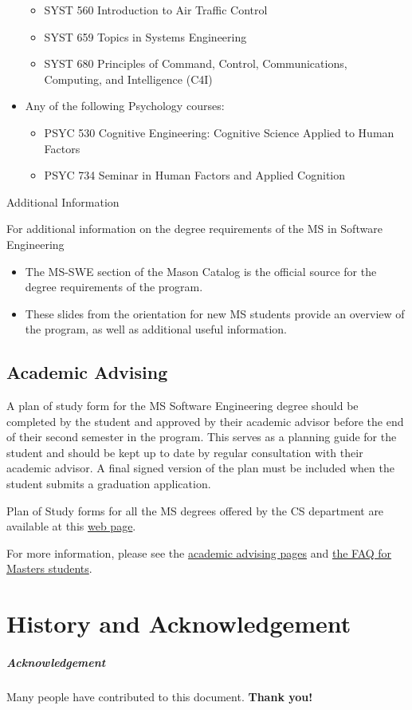 \documentclass[oneside,11pt]{memoir}
\begin{document}
\begin{itemize}
    \begin{itemize}
        \item SYST 560 Introduction to Air Traffic Control
        \item SYST 659 Topics in Systems Engineering
        \item SYST 680 Principles of Command, Control, Communications, Computing, and Intelligence (C4I)
\end{itemize}        
    \item Any of the following Psychology courses:
    \begin{itemize}
        \item PSYC 530 Cognitive Engineering: Cognitive Science Applied to Human Factors
        \item PSYC 734 Seminar in Human Factors and Applied Cognition
\end{itemize}        
\end{itemize}
Additional Information

For additional information on the degree requirements of the MS in Software Engineering
\begin{itemize}
    \item The MS-SWE section of the Mason Catalog is the official source for the degree requirements of the program.
    \item These slides from the orientation for new MS students provide an overview of the program, as well as additional useful information.
\end{itemize}

\section{Academic Advising}

A plan of study form for the MS Software Engineering degree should be completed by the student and approved by their academic advisor before the end of their second semester in the program. This serves as a planning guide for the student and should be kept up to date by regular consultation with their academic advisor. A final signed version of the plan must be included when the student submits a graduation application.

Plan of Study forms for all the MS degrees offered by the CS department are available at this \href{https://cs.gmu.edu/resources/student-forms/}{web page}.

For more information, please see the \href{https://cs.gmu.edu/current-students/ms-students/advising/}{academic advising pages} and \href{https://cs.gmu.edu/current-students/ms-students/faqs/}{the FAQ for Masters students}.


\chapter{History and Acknowledgement}\label{sec:ack}


\paragraph{Acknowledgement} Many people have contributed to this document.
\textbf{Thank you!}



\end{document}
